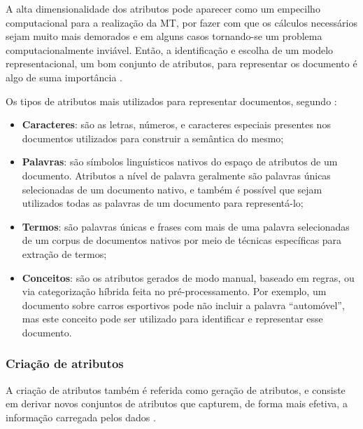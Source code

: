             A alta dimensionalidade dos atributos pode aparecer como um empecilho computacional para a realização da MT, por fazer com que os cálculos necessários sejam muito mais demorados e em alguns casos tornando-se um problema computacionalmente inviável.
            Então, a identificação e escolha de um modelo representacional, um bom conjunto de atributos, para representar os documento é algo de suma importância \cite[p.~4]{Feldman:2006:TMH:1076381}.
            
            Os tipos de atributos mais utilizados para representar documentos, segundo  :
            \begin{itemize}
                \item \textbf{Caracteres}: são as letras, números, e caracteres especiais presentes nos documentos utilizados para construir a semântica do mesmo;
                
                \item \textbf{Palavras}: são símbolos linguísticos nativos do espaço de atributos de um documento. 
                Atributos a nível de palavra geralmente são palavras únicas selecionadas de um documento nativo, e também é possível que sejam utilizados todas as palavras de um documento para representá-lo;
                
                \item \textbf{Termos}: são palavras únicas e frases com mais de uma palavra selecionadas de um corpus de documentos nativos por meio de técnicas específicas para extração de termos;
                
                \item \textbf{Conceitos}: são os atributos gerados de modo manual, baseado em regras, ou via categorização híbrida feita no pré-processamento. 
                Por exemplo, um documento sobre carros esportivos pode não incluir a palavra ``automóvel'', mas este conceito pode ser utilizado para identificar e representar esse documento.
            \end{itemize}
            
            
       \subsubsection{Criação de atributos} \label{subsubsec:Criação-de-atributos} 
            A criação de atributos também é referida como geração de atributos, e consiste em derivar novos conjuntos de atributos que capturem, de forma mais efetiva, a informação carregada pelos dados \cite[p.~55]{TanIDM2014}.
            
